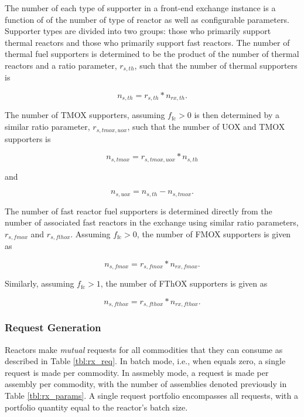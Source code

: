 The number of each type of supporter in a front-end exchange instance is a
function of of the number of type of reactor as well as configurable
parameters. Supporter types are divided into two groups: those who primarily
support thermal reactors and those who primarily support fast reactors. The
number of thermal fuel supporters is determined to be the product of the number
of thermal reactors and a ratio parameter, $r_{s, th}$, such that the number of
thermal supporters is

\begin{equation}
n_{s, th} = r_{s, th} * n_{rx, th}.
\end{equation}

The number of TMOX supporters, assuming $f_{\text{fc}} > 0$ is then determined by a
similar ratio parameter, $r_{s, tmox, uox}$, such that the number of UOX and
TMOX supporters is

\begin{equation}
n_{s, tmox} = r_{s, tmox, uox} * n_{s, th}
\end{equation}

and

\begin{equation}
n_{s, uox} = n_{s, th} - n_{s, tmox}.
\end{equation}

The number of fast reactor fuel supporters is determined directly from the number
of associated fast reactors in the exchange using similar ratio parameters,
$r_{s, fmox}$ and $r_{s, fthox}$. Assuming $f_{\text{fc}} > 0$, the number of FMOX
supporters is given as

\begin{equation}
n_{s, fmox} = r_{s, fmox} * n_{rx, fmox}.
\end{equation}

Similarly, assuming $f_{\text{fc}} > 1$, the number of FThOX supporters is given as  

\begin{equation}
n_{s, fthox} = r_{s, fthox} * n_{rx, fthox}.
\end{equation}

\subsubsection{Request Generation}\label{method:setup:front:reqgen}

Reactors make \textit{mutual} requests for all commodities that they can consume
as described in Table \ref{tbl:rx_req}. In batch mode, i.e., when \frx
equals zero, a single request is made per commodity. In assmebly mode, a request
is made per assembly per commodity, with the number of assemblies denoted
previously in Table \ref{tbl:rx_params}. A single request portfolio encompasses
all requests, with a portfolio quantity equal to the reactor's batch size.

